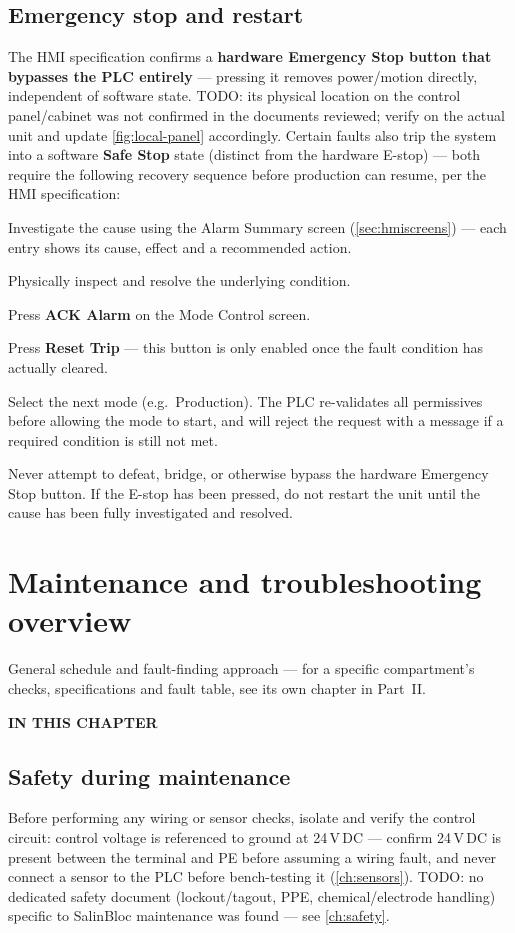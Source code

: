 \documentclass[a4paper,11pt,twoside,openright,numbers=noenddot]{scrreprt}
\newcommand{\chaptersubtitle}[1]{%
  \vspace{-12pt}\par
  {\sffamily\fontsize{13}{17}\selectfont\color{hvmuted}\raggedright #1\par}
  \vspace{10pt}}
\newcommand{\chaptertoc}{%
  \begingroup
  \etocsetnexttocdepth{1}%
  \etocsettocstyle
    {{\sffamily\bfseries\footnotesize\color{hvmuted}IN THIS CHAPTER\par}%
     \vspace{5pt}{\color{hvink}\rule{\linewidth}{1.2pt}}\par\vspace{2pt}}{}%
  \etocsetstyle{section}{}{}
    {\par\vspace{4pt}\noindent
     \makebox[11mm][l]{\sffamily\bfseries\small\color{hvprimary}\etocnumber}%
     \sffamily\small\etocname\hfill{\color{hvmuted}\etocpage}%
     \par\vspace{4pt}{\color{hvrule}\rule{\linewidth}{0.4pt}}}{}%
  \localtableofcontents
  \endgroup}
\newcommand{\salinbloc}{SalinBloc\texttrademark\xspace}
\begin{document}
\section{Emergency stop and restart}
\label{sec:estop}
The HMI specification confirms a \textbf{hardware Emergency Stop button
that bypasses the PLC entirely} --- pressing it removes power/motion
directly, independent of software state. TODO: its physical location on
the control panel/cabinet was not confirmed in the documents reviewed;
verify on the actual unit and update \cref{fig:local-panel} accordingly.
Certain faults also trip the system into a software \textbf{Safe Stop}
state (distinct from the hardware E-stop) --- both require the following
recovery sequence before production can resume, per the HMI specification:
\begin{procedure}
\item Investigate the cause using the Alarm Summary screen
  (\cref{sec:hmiscreens}) --- each entry shows its cause, effect and a
  recommended action.
\item Physically inspect and resolve the underlying condition.
\item Press \textbf{ACK Alarm} on the Mode Control screen.
\item Press \textbf{Reset Trip} --- this button is only enabled once the
  fault condition has actually cleared.
\item Select the next mode (e.g.\ Production). The PLC re-validates all
  permissives before allowing the mode to start, and will reject the
  request with a message if a required condition is still not met.
\end{procedure}
\begin{danger}
Never attempt to defeat, bridge, or otherwise bypass the hardware
Emergency Stop button. If the E-stop has been pressed, do not restart the
unit until the cause has been fully investigated and resolved.
\end{danger}


\chapter{Maintenance and troubleshooting overview}
\label{ch:maintenance}
\chaptersubtitle{General schedule and fault-finding approach --- for a
  specific compartment's checks, specifications and fault table, see its own
  chapter in Part~II.}
\chaptertoc

\section{Safety during maintenance}
Before performing any wiring or sensor checks, isolate and verify the
control circuit: control voltage is referenced to ground at 24\,V\,DC ---
confirm 24\,V\,DC is present between the terminal and PE before assuming a
wiring fault, and never connect a sensor to the PLC before bench-testing it
(\cref{ch:sensors}). TODO: no dedicated safety document (lockout/tagout,
PPE, chemical/electrode handling) specific to \salinbloc maintenance was
found --- see \cref{ch:safety}.
\end{document}
